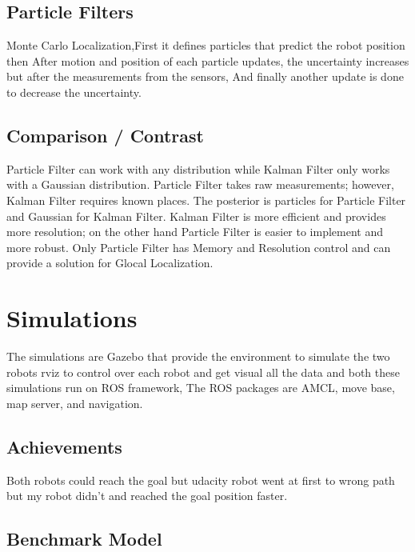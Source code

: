 \documentclass[10pt,journal,compsoc]{IEEEtran}
\begin{document}
\subsection{Particle Filters}
Monte Carlo Localization,First it defines particles that predict the robot position then After motion and position of each particle updates, the uncertainty increases but after the measurements from the sensors, And finally another update is done to decrease the uncertainty.


\subsection{Comparison / Contrast}
Particle Filter can work with any distribution while Kalman Filter only works with a Gaussian distribution. Particle Filter takes raw measurements; however, Kalman Filter requires known places. The posterior is particles for Particle Filter and Gaussian for Kalman Filter. Kalman Filter is more efficient and provides more resolution; on the other hand Particle Filter is easier to implement and more robust. Only Particle Filter has Memory and Resolution control and can provide a solution for Glocal Localization.

\section{Simulations}
The simulations are Gazebo that provide the environment to simulate the two robots rviz to control over each robot and get visual all the data and both these simulations run on ROS framework, The ROS packages are AMCL, move base, map server, and navigation.

\subsection{Achievements}
Both robots could reach the goal but udacity robot went at first to wrong path but my robot didn't and reached the goal position faster.

\subsection{Benchmark Model}
\end{document}
